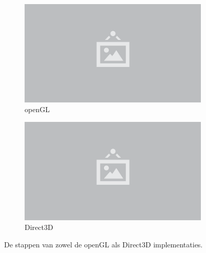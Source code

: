 \begin{figure}
  \centering
  \begin{subfigure}{.8\textwidth}
    \centering\includegraphics[width=\linewidth]{./img/raw/placeholder.png}
    \caption{openGL}\label{fig:mgp-pipeline-opengl}
  \end{subfigure}
  \begin{subfigure}{.8\textwidth}
    \centering\includegraphics[width=\linewidth]{./img/raw/placeholder.png}
    \caption{Direct3D}\label{fig:mgp-pipeline-direct3d}
  \end{subfigure}
  \caption{De stappen van zowel de openGL als Direct3D implementaties.}
  \label{fig:mgp-pipeline}
\end{figure}
